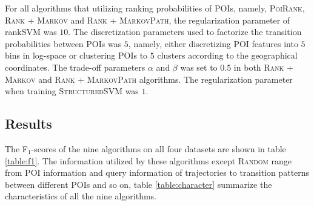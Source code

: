 For all algorithms that utilizing ranking probabilities of POIs, namely, \textsc{PoiRank}, \textsc{Rank} + \textsc{Markov} and 
\textsc{Rank} + \textsc{MarkovPath}, the regularization parameter of rankSVM was $10$.
The discretization parameters used to factorize the transition probabilities between POIs was $5$, namely,
either discretizing POI features into $5$ bins in log-space or clustering POIs to $5$ clusters according to the geographical coordinates.
The trade-off parameters $\alpha$ and $\beta$ was set to $0.5$ in both \textsc{Rank} + \textsc{Markov} and 
\textsc{Rank} + \textsc{MarkovPath} algorithms.
The regularization parameter when training \textsc{StructuredSVM} was $1$.


\subsection{Results}
The F$_1$-scores of the nine algorithms on all four datasets are shown in table \ref{table:f1}.
The information utilized by these algorithms except \textsc{Random} range from POI information and query information 
of trajectories to transition patterns between different POIs and so on, table \ref{table:character} summarize the 
characteristics of all the nine algorithms.

